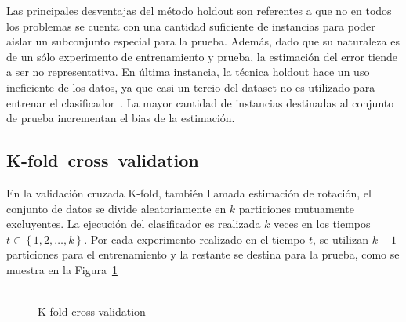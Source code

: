 \documentclass{article}
\begin{document}
Las principales desventajas del método holdout son referentes a que no en todos los problemas se cuenta con una cantidad suficiente de instancias para poder aislar un subconjunto especial para la prueba.
Además, dado que su naturaleza es de un sólo experimento de entrenamiento y prueba, la estimación del error tiende a ser no representativa.
En última instancia, la técnica holdout hace un uso ineficiente de los datos, ya que casi un tercio del dataset no es utilizado para entrenar el clasificador~\cite{RonKohavi}.
La mayor cantidad de instancias destinadas al conjunto de prueba incrementan el bias de la estimación.


\subsection{K-­fold cross validation}
En la validación cruzada K-fold, también llamada estimación de rotación, el conjunto de datos se divide aleatoriamente en $k$ particiones mutuamente excluyentes.
La ejecución del clasificador es realizada $k$ veces en los tiempos $t \in \left \{ 1,2,\ldots,k \right \} $.
Por cada experimento realizado en el tiempo $t$, se utilizan $k-1$ particiones para el entrenamiento y la restante se destina para la prueba, como se muestra en la Figura~\ref{fig:k-fold}
\begin{figure}
	\centering
	\includegraphics[width=0.5]{resources/images/k-fold}
	\caption{K-fold cross validation}
	\label{fig:k-fold}
\end{figure}
\end{document}

